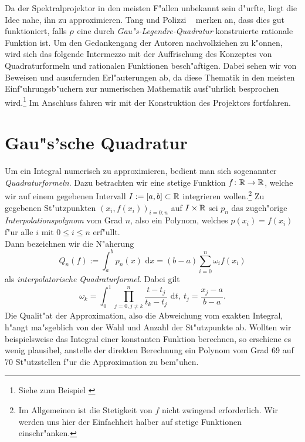 Da der Spektralprojektor in den meisten F"allen unbekannt sein d"urfte, liegt
die Idee nahe, ihn zu approximieren. Tang und Polizzi ~\cite[356]{ptep} merken an, dass dies gut funktioniert, falls $\rho$ eine durch \emph{Gau"s-Legendre-Quadratur} konstruierte rationale Funktion ist.
Um den Gedankengang der Autoren nachvollziehen zu k"onnen, wird sich das folgende Intermezzo mit der Auffrischung des Konzeptes von Quadraturformeln und rationalen Funktionen besch"aftigen. Dabei sehen wir von Beweisen und ausufernden Erl"auterungen ab, da diese Thematik in den meisten Einf"uhrungsb"uchern zur numerischen Mathematik ausf"uhrlich besprochen wird.\footnote{Siehe zum Beispiel \cite[Abschnitt 6]{plato}} Im Anschluss fahren wir mit der
Konstruktion des Projektors fortfahren.

\section{Gau"s'sche Quadratur}

Um ein Integral numerisch zu approximieren, bedient man sich sogenannter \emph{Quadraturformeln}. Dazu betrachten wir eine stetige Funktion $f\colon\mathbb{R}\to\mathbb{R}$, welche wir auf einem gegebenen Intervall $I:=[a,b]\subset\mathbb{R}$ integrieren wollen.\footnote{Im Allgemeinen ist die Stetigkeit von $f$ nicht zwingend erforderlich. Wir werden uns hier der Einfachheit halber auf stetige Funktionen einschr"anken.}
Zu gegebenen St"utzpunkten $(x_i, f(x_i))_{i=0:n}$ auf $I\times\mathbb{R}$ sei $p_n$ das zugeh"orige \emph{Interpolationspolynom} vom Grad $n$, also ein Polynom, welches $p(x_i) = f(x_i)$ f"ur alle $i$ mit $0\le i\le n$ erf"ullt.\\

Dann bezeichnen wir die N"aherung
\begin{equation}\label{eq:quadratur}
Q_n(f) := \int_a^b p_n (x)\text{ d}x =
(b-a)\sum_{i=0}^n \omega_i f(x_i)
\end{equation}
als \emph{interpolatorische Quadraturformel}. Dabei gilt
\[
\omega_k = \int_0^1 \prod_{j=0,j\neq k}^n
\frac{t-t_j}{t_k - t_j} \text{ d}t, \ t_j
= \frac{x_j-a}{b-a}.
\]
Die Qualit"at der Approximation, also die Abweichung vom exakten Integral, h"angt ma"sgeblich von der Wahl und Anzahl der St"utzpunkte ab. Wollten wir
beispielsweise das Integral einer konstanten Funktion berechnen, so erschiene es wenig plausibel, anstelle der direkten Berechnung ein Polynom vom Grad 69 auf 70 St"utzstellen f"ur die Approximation zu bem"uhen.

\newpage

